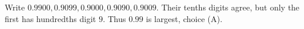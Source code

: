 Write $0.9900,0.9099,0.9000,0.9090,0.9009$. Their tenths digits agree, but only the first has hundredths digit $9$. Thus $\boxed{0.99}$ is largest, choice (A).
